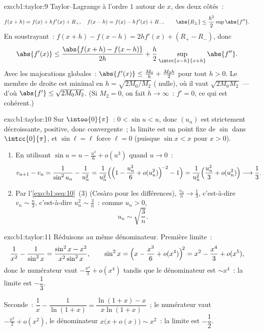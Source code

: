 \begin{solution}{exo:b1:taylor:9}
Taylor--Lagrange à l'ordre $1$ autour de $x$, des deux côtés~:
\[
f(x + h) = f(x) + h f'(x) + R_+,\quad
f(x - h) = f(x) - h f'(x) + R_-,
\qquad \abs{R_\pm} \leq \frac{h^2}{2} \sup \abs{f''} .
\]
En soustrayant~: $f(x+h) - f(x-h) = 2h f'(x) + (R_+ - R_-)$, donc
\[
\abs{f'(x)} \leq \frac{\abs{f(x+h) - f(x-h)}}{2h} +
\frac{h}{2}\sup_{\intcc{x-h}{x+h}}\abs{f''} .
\]
Avec les majorations globales~: $\abs{f'(x)} \leq \frac{M_0}{h} +
\frac{M_2 h}{2}$ pour tout $h > 0$. Le membre de droite est minimal en
$h = \sqrt{2M_0/M_2}$ ( nulle), où il vaut $\sqrt{2M_0M_2}$
--- d'où $\abs{f'} \leq \sqrt{2M_0M_2}$. (Si $M_2 = 0$, on fait $h \to
\infty$~: $f' = 0$, ce qui est cohérent.)
\end{solution}

\begin{solution}{exo:b1:taylor:10}
Sur $\intoo{0}{\pi}$~: $0 < \sin u < u$, donc $(u_n)$ est strictement
décroissante, positive, donc convergente~; la limite est un point fixe
de $\sin$ dans $\intcc{0}{\pi}$, et $\sin \ell = \ell$ force $\ell =
0$ (puisque $\sin x < x$ pour $x > 0$).
\begin{enumerate}
  \item En utilisant $\sin u = u - \frac{u^3}{6} + o(u^3)$ quand $u \to 0$~:
        \[
        v_{n+1} - v_n = \frac{1}{\sin^2 u_n} - \frac{1}{u_n^2}
        = \frac{1}{u_n^2}\Bigl(\Bigl(1 - \frac{u_n^2}{6} +
        o(u_n^2)\Bigr)^{\!-2} - 1\Bigr)
        = \frac{1}{u_n^2}\Bigl(\frac{u_n^2}{3} + o(u_n^2)\Bigr)
        \longrightarrow \frac13 .
        \]
  \item Par l'\cref{exo:b1:seq:10}~(3) (Cesàro pour les différences),
        $\frac{v_n}{n} \to \frac13$, c'est-à-dire $v_n \sim \frac n3$,
        c'est-à-dire $u_n^2 \sim \frac 3n$~: comme $u_n > 0$,
        \[
        u_n \sim \sqrt{\frac{3}{n}} .
        \]
\end{enumerate}
\end{solution}

\begin{solution}{exo:b1:taylor:11}
Réduisons au même dénominateur. Première limite~:
\[
\frac{1}{x^2} - \frac{1}{\sin^2 x}
= \frac{\sin^2 x - x^2}{x^2\sin^2 x},
\qquad
\sin^2 x = \Bigl(x - \frac{x^3}{6} + o(x^4)\Bigr)^{\!2}
= x^2 - \frac{x^4}{3} + o(x^5) ,
\]
donc le numérateur vaut $-\frac{x^4}{3} + o(x^4)$ tandis que le
dénominateur est $\sim x^4$~: la limite est $-\dfrac13$.

Seconde~: $\dfrac1x - \dfrac{1}{\ln(1+x)} = \dfrac{\ln(1+x) -
x}{x\ln(1+x)}$~; le numérateur vaut $-\frac{x^2}{2} + o(x^2)$, le
dénominateur $x\bigl(x + o(x)\bigr) \sim x^2$~: la limite est
$-\dfrac12$.
\end{solution}

